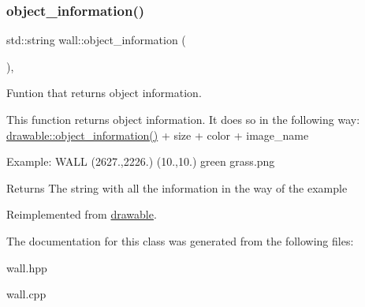 \mbox{\label{classwall_aab1de4f144f176b134a967ba08747932}} 
\subsubsection{\texorpdfstring{object\+\_\+information()}{object\_information()}}
{\footnotesize\ttfamily std\+::string wall\+::object\+\_\+information (\begin{DoxyParamCaption}{ }\end{DoxyParamCaption})\hspace{0.3cm}{\ttfamily [override]}, {\ttfamily [virtual]}}



Funtion that returns object information. 

This function returns object information. It does so in the following way\+: \hyperlink{classdrawable_a2ed0f8bb53f33477f7722efa7bb24583}{drawable\+::object\+\_\+information()} + size + color + image\+\_\+name

Example\+: W\+A\+LL (2627.,2226.) (10.,10.) green grass.\+png

\begin{DoxyReturn}{Returns}
The string with all the information in the way of the example 
\end{DoxyReturn}


Reimplemented from \hyperlink{classdrawable_a2ed0f8bb53f33477f7722efa7bb24583}{drawable}.



The documentation for this class was generated from the following files\+:\begin{DoxyCompactItemize}
\item 
wall.\+hpp\item 
wall.\+cpp\end{DoxyCompactItemize}
